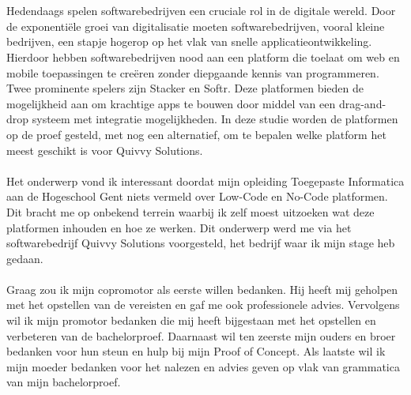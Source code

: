 
\chapter*{}%
\label{ch:voorwoord}

Hedendaags spelen softwarebedrijven een cruciale rol in de digitale wereld. 
Door de exponentiële groei van digitalisatie moeten softwarebedrijven, vooral kleine bedrijven, 
een stapje hogerop op het vlak van snelle applicatieontwikkeling. Hierdoor hebben softwarebedrijven nood aan 
een platform die toelaat om web en mobile toepassingen te creëren zonder diepgaande kennis van programmeren. 
Twee prominente spelers zijn Stacker en Softr. Deze platformen bieden de mogelijkheid aan om krachtige apps te bouwen 
door middel van een drag-and-drop systeem met integratie mogelijkheden. In deze studie worden de platformen op de proef gesteld, 
met nog een alternatief, om te bepalen welke platform het meest geschikt is voor Quivvy Solutions.
\\
\\
Het onderwerp vond ik interessant doordat mijn opleiding Toegepaste Informatica aan de Hogeschool Gent niets vermeld over Low-Code en No-Code platformen.
Dit bracht me op onbekend terrein waarbij ik zelf moest uitzoeken wat deze platformen inhouden en hoe ze werken. Dit onderwerp werd me via 
het softwarebedrijf Quivvy Solutions voorgesteld, het bedrijf waar ik mijn stage heb gedaan.
\\
\\
Graag zou ik mijn copromotor als eerste willen bedanken. Hij heeft mij geholpen met het opstellen van de vereisten en gaf me ook
professionele advies. Vervolgens wil ik mijn promotor bedanken die mij heeft bijgestaan met het opstellen en verbeteren van de bachelorproef. Daarnaast 
wil ten zeerste mijn ouders en broer bedanken voor hun steun en hulp bij mijn Proof of Concept. 
Als laatste wil ik mijn moeder bedanken voor het nalezen en advies geven op vlak van grammatica van mijn bachelorproef.
